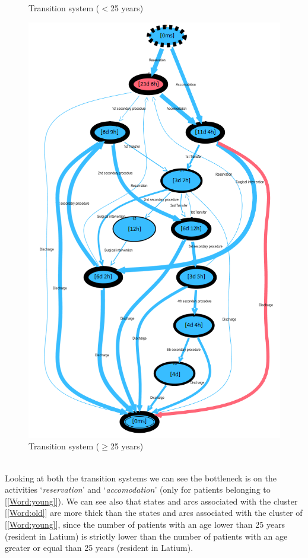 \begin{figure} [htbp]
\begin{minipage}[t]{0.3\textwidth}
\caption{Transition system ($<$25 years)}
\end{minipage}
\begin{minipage}[t]{0.55\textwidth}
\includegraphics[width=\textwidth]{RicoveriTransitionSystemSojournOlds}
\caption{Transition system ($\geq$25 years)}
\end{minipage}
\end{figure}\\
Looking at both the transition systems we can see the bottleneck is on the activities `\textit{reservation}' and `\textit{accomodation}' (only for patients belonging to [\ref{Word:young}]). We can see also that states and arcs associated with the cluster [\ref{Word:old}] are more thick than the states and arcs associated with the cluster of [\ref{Word:young}], since the number of patients with an age lower than 25 years (resident in Latium) is strictly lower than the number of patients with an age greater or equal than 25 years (resident in Latium).
\clearpage
\noindent
